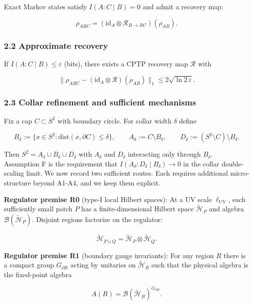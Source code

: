 \documentclass[
]{article}
\begin{document}
Exact Markov states satisfy \(I(A:C \mid B) = 0\) and admit a recovery
map:

\[
\rho_{ABC} = (\mathrm{id}_A \otimes \mathcal R_{B\to BC})(\rho_{AB}).
\]

\subsubsection{2.2 Approximate recovery}\label{approximate-recovery}

If \(I(A:C \mid B) \le \varepsilon\) (bits), there exists a CPTP
recovery map \(\mathcal{R}\) with

\[
\| \rho_{ABC} - (\mathrm{id}_A \otimes \mathcal R)(\rho_{AB}) \|_1
\le 2 \sqrt{\ln 2\, \varepsilon}.
\]

\subsubsection{2.3 Collar refinement and sufficient
mechanisms}\label{collar-refinement-and-sufficient-mechanisms}

Fix a cap \(C \subset S^2\) with boundary circle. For collar width
\(\delta\) define

\[
B_\delta := \{x \in S^2 : \mathrm{dist}(x,\partial C) \le \delta\},
\qquad
A_\delta := C \setminus B_\delta,
\qquad
D_\delta := (S^2 \setminus C) \setminus B_\delta.
\]

Then \(S^2 = A_\delta \cup B_\delta \cup D_\delta\) with \(A_\delta\)
and \(D_\delta\) interacting only through \(B_\delta\). Assumption F is
the requirement that \(I(A_\delta:D_\delta \mid B_\delta) \to 0\) in the
collar double-scaling limit. We now record two sufficient routes. Each
requires additional micro-structure beyond A1-A4, and we keep them
explicit.

\textbf{Regulator premise R0} (type-I local Hilbert spaces): At a UV
scale \(\ell_{\mathrm{UV}}\), each sufficiently small patch \(P\) has a
finite-dimensional Hilbert space \(\tilde{\mathcal H}_P\) and algebra
\(\mathcal B(\tilde{\mathcal H}_P)\). Disjoint regions factorize on the
regulator:

\[
\tilde{\mathcal H}_{P \sqcup Q} = \tilde{\mathcal H}_P \otimes \tilde{\mathcal H}_Q.
\]

\textbf{Regulator premise R1} (boundary gauge invariants): For any
region \(R\) there is a compact group \(G_{\partial R}\) acting by
unitaries on \(\tilde{\mathcal H}_R\) such that the physical algebra is
the fixed-point algebra

\[
A(R) = \mathcal B(\tilde{\mathcal H}_R)^{G_{\partial R}}.
\]
\end{document}
